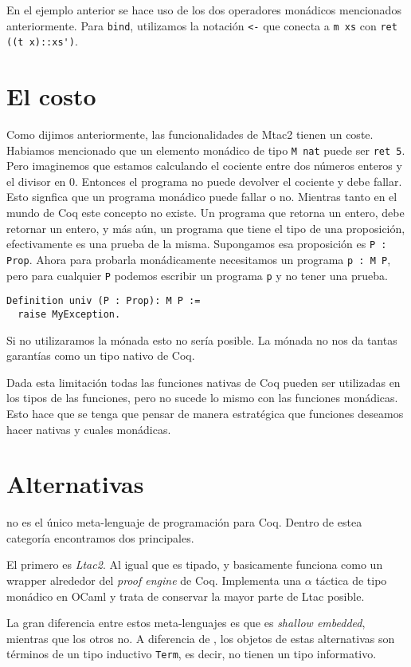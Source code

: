 En el ejemplo anterior se hace uso de los dos operadores monádicos mencionados anteriormente. Para \lstinline{bind}, utilizamos la notación \lstinline{<-} que conecta a \lstinline{m xs} con \lstinline{ret ((t x)::xs')}.

\section{El costo}

Como dijimos anteriormente, las funcionalidades de Mtac2 tienen un coste. Habiamos mencionado que un elemento monádico de tipo \lstinline{M nat} puede ser \lstinline{ret 5}. Pero imaginemos que estamos calculando el cociente entre dos números enteros y el divisor en 0. Entonces el programa no puede devolver el cociente y debe fallar. Esto signfica que un programa monádico puede fallar o no. Mientras tanto en el mundo de Coq este concepto no existe. Un programa que retorna un entero, debe retornar un entero, y más aún, un programa que tiene el tipo de una proposición, efectivamente es una prueba de la misma. Supongamos esa proposición es \lstinline{P : Prop}. Ahora para probarla monádicamente necesitamos un programa \lstinline{p : M P}, pero para cualquier \lstinline{P} podemos escribir un programa \lstinline{p} y no tener una prueba.
\begin{lstlisting}
Definition univ (P : Prop): M P :=
  raise MyException.
\end{lstlisting}

Si no utilizaramos la mónada esto no sería posible. La mónada no nos da tantas garantías como un tipo nativo de Coq.

Dada esta limitación todas las funciones nativas de Coq pueden ser utilizadas en los tipos de las funciones, pero no sucede lo mismo con las funciones monádicas. Esto hace que se tenga que pensar de manera estratégica que funciones deseamos hacer nativas y cuales monádicas.

\section{Alternativas}

\Mtac no es el único meta-lenguaje de programación para Coq. 
Dentro de estea categoría encontramos dos principales.

El primero es \emph{Ltac2}. Al igual que \Mtac es tipado, y basicamente funciona como un wrapper alrededor del \emph{proof engine} de Coq.
Implementa una $\alpha$ táctica de tipo monádico en OCaml y trata de conservar la mayor parte de Ltac posible.

La gran diferencia entre estos meta-lenguajes es que \Mtac es \emph{shallow embedded}, mientras que los otros no. A diferencia de \Mtac, los objetos de estas alternativas son términos de un tipo inductivo \lstinline{Term}, es decir, no tienen un tipo informativo.
